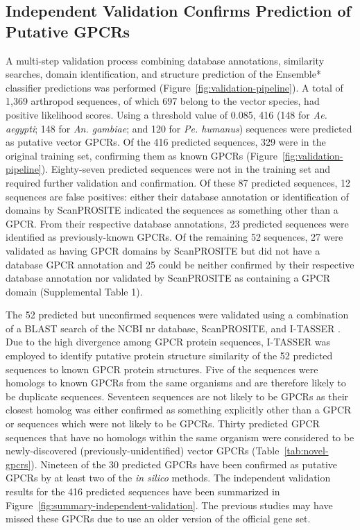 \subsection{Independent Validation Confirms Prediction of Putative GPCRs}

A multi-step validation process combining database annotations, similarity searches, domain identification, and structure prediction of the Ensemble* classifier predictions was performed (Figure~\ref{fig:validation-pipeline}). A total of 1,369 arthropod sequences, of which 697 belong to the vector species, had positive likelihood scores.  Using a threshold value of 0.085, 416 (148 for \emph{Ae. aegypti}; 148 for \emph{An. gambiae}; and 120 for \emph{Pe. humanus}) sequences were predicted as putative vector GPCRs. Of the 416 predicted sequences, 329 were in the original training set, confirming them as known GPCRs (Figure~\ref{fig:validation-pipeline}). Eighty-seven predicted sequences were not in the training set and required further validation and confirmation.  Of these 87 predicted sequences, 12 sequences are false positives: either their database annotation or identification of domains by ScanPROSITE \cite{DeCastro2006} indicated the sequences as something other than a GPCR.  From their respective database annotations, 23 predicted sequences were identified as previously-known GPCRs. Of the remaining 52 sequences, 27 were validated as having GPCR domains by ScanPROSITE but did not have a database GPCR annotation and 25 could be neither confirmed by their respective database annotation nor validated by ScanPROSITE as containing a GPCR domain (Supplemental Table 1).

The 52 predicted but unconfirmed sequences were validated using a combination of a BLAST search of the NCBI nr database, ScanPROSITE, and I-TASSER \cite{Zhang2007}.  Due to the high divergence among GPCR protein sequences, I-TASSER was employed to identify putative protein structure similarity of the 52 predicted sequences to known GPCR protein structures. Five of the sequences were homologs to known GPCRs from the same organisms and are therefore likely to be duplicate sequences. Seventeen sequences are not likely to be GPCRs as their closest homolog was either confirmed as something explicitly other than a GPCR or sequences which were not likely to be GPCRs. Thirty predicted GPCR sequences that have no homologs within the same organism were considered to be newly-discovered (previously-unidentified) vector GPCRs (Table~\ref{tab:novel-gpcrs}). Nineteen of the 30 predicted GPCRs have been confirmed as putative GPCRs by at least two of the \textit{in silico} methods. The independent validation results for the 416 predicted sequences have been summarized in Figure~\ref{fig:summary-independent-validation}. The previous studies may have missed these GPCRs due to use an older version of the official gene set.

